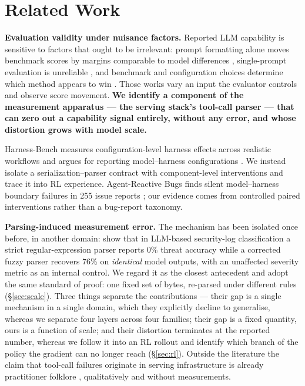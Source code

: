 \section{Related Work}
\label{sec:related}

\textbf{Evaluation validity under nuisance factors.} Reported LLM capability is sensitive to
factors that ought to be irrelevant: prompt formatting alone moves benchmark scores by margins
comparable to model differences \citep{sclar2024formatspread}, single-prompt evaluation is
unreliable \citep{mizrahi2024stateofwhatart}, and benchmark and configuration choices determine
which method appears to win \citep{dehghani2021benchmarklottery}. Those works vary an input the
evaluator controls and observe score movement. \textbf{We identify a component of the measurement
apparatus --- the serving stack's tool-call parser --- that can zero out a capability signal
entirely, without any error, and whose distortion grows with model scale.}

Harness-Bench measures configuration-level harness effects across realistic workflows and argues
for reporting model--harness configurations \citep{yao2026harnessbench}. We instead isolate a
serialization--parser contract with component-level interventions and trace it into RL experience.
Agent-Reactive Bugs finds silent model--harness boundary failures in 255 issue reports
\citep{chen2026agentreactive}; our evidence comes from controlled paired interventions rather than
a bug-report taxonomy.

\textbf{Parsing-induced measurement error.} The mechanism has been isolated once before, in
another domain: \citet{garware2026brokenruler} show that in LLM-based security-log classification
a strict regular-expression parser reports 0\% threat accuracy while a corrected fuzzy parser
recovers 76\% on \emph{identical} model outputs, with an unaffected severity metric as an internal
control. We regard it as the closest antecedent and adopt the same standard of proof: one fixed
set of bytes, re-parsed under different rules (\S\ref{sec:scale}). Three things separate the
contributions --- their gap is a single mechanism in a single domain, which they explicitly
decline to generalise, whereas we separate four layers across four families; their gap is a fixed
quantity, ours is a function of scale; and their distortion terminates at the reported number,
whereas we follow it into an RL rollout and identify which branch of the policy the gradient can
no longer reach (\S\ref{sec:rl}). Outside the literature the claim that tool-call failures
originate in serving infrastructure is already practitioner folklore
\citep{livekit2026servingstack}, qualitatively and without measurements.

